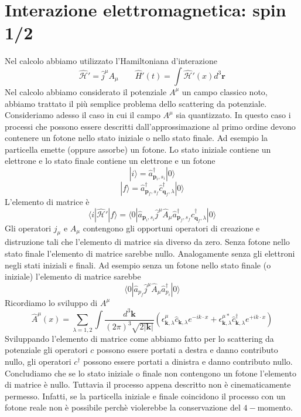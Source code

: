 \section{Interazione elettromagnetica: spin 1/2}
Nel calcolo abbiamo utilizzato l'Hamiltoniana d'interazione
$$
\hat{\mathcal{H}}' = \hat{j}^\mu A_\mu \qquad \hat{H}'(t) = \int \hat{\mathcal{H}}'(x) d^3\mathbf{r}
$$
Nel calcolo abbiamo considerato il potenziale $A^\mu$ un campo classico noto, abbiamo trattato il più semplice problema dello scattering da potenziale. Consideriamo adesso il caso in cui il campo $A^\mu$ sia quantizzato. In questo caso i processi che possono essere descritti dall'approssimazione al primo ordine devono contenere un fotone nello stato iniziale o nello stato finale. Ad esempio la particella emette (oppure assorbe) un fotone. Lo stato iniziale contiene un elettrone e lo stato finale contiene un elettrone e un fotone
$$
|i\rangle = \hat{a}_{\mathbf{p}_i, s_i}^\dagger |0\rangle
$$
$$
|f\rangle = \hat{a}_{\mathbf{p}_f, s_f}^\dagger \hat{c}_{\mathbf{q}_f, \lambda}^\dagger |0\rangle
$$
L'elemento di matrice è
$$
\langle i | \hat{\mathcal{H}}' | f \rangle = \langle 0 | \hat{a}_{\mathbf{p}_i, s_i} \hat{j}^\mu \hat{A}_\mu \hat{a}_{\mathbf{p}_f, s_f}^\dagger \hat{c}_{\mathbf{q}_f, \lambda}^\dagger |0\rangle
$$
Gli operatori $j_\mu$ e $A_\mu$ contengono gli opportuni operatori di creazione e distruzione tali che l'elemento di matrice sia diverso da zero. Senza fotone nello stato finale l'elemento di matrice sarebbe nullo. Analogamente senza gli elettroni negli stati iniziali e finali. Ad esempio senza un fotone nello stato finale (o iniziale) l'elemento di matrice sarebbe
$$
\langle 0 | \hat{a}_{p_f} \hat{j}^\mu \hat{A}_\mu \hat{a}_{p_i}^\dagger | 0 \rangle
$$
Ricordiamo lo sviluppo di $A^\mu$
$$
\hat{A}^\mu(x) = \sum_{\lambda=1,2} \int \frac{d^3\mathbf{k}}{(2\pi)^3 \sqrt{2|\mathbf{k}|}} \left( \epsilon^\mu_{\mathbf{k},\lambda} \hat{c}_{\mathbf{k},\lambda} e^{-ik\cdot x} + \epsilon^{\mu *}_{\mathbf{k},\lambda} \hat{c}_{\mathbf{k},\lambda}^\dagger e^{+ik\cdot x} \right)
$$
Sviluppando l'elemento di matrice come abbiamo fatto per lo scattering da potenziale gli operatori $c$ possono essere portati a destra e danno contributo nullo, gli operatori $c^\dagger$ possono essere portati a dinistra e danno contributo nullo. Concludiamo che se lo stato iniziale o finale non contengono un fotone l'elemento di matrice è nullo. Tuttavia il processo appena descritto non è cinematicamente permesso. Infatti, se la particella iniziale e finale coincidono il processo con un fotone reale non è possibile perchè violerebbe la conservazione del $4-$momento.
